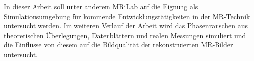 In dieser Arbeit soll unter anderem MRiLab auf die Eignung als Simulationsumgebung für kommende Entwicklungstätigkeiten in der MR-Technik untersucht werden. Im weiteren Verlauf der Arbeit wird das Phasenrauschen aus theoretischen Überlegungen, Datenblättern und realen Messungen simuliert und die Einflüsse von diesem auf die Bildqualität der rekonstruierten MR-Bilder untersucht.


